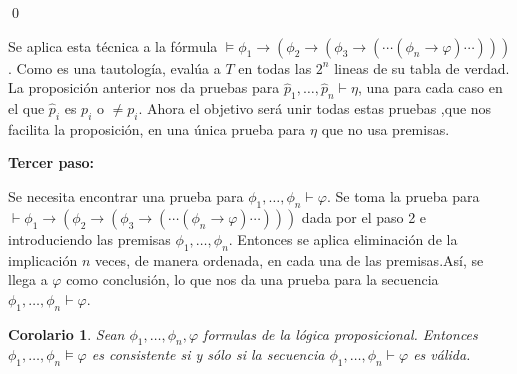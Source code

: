 \documentclass[18pt]{article}
\newtheorem{Cor}{Corolario}
\begin{document}
\qed

Se aplica esta técnica a la fórmula $\models \phi_1 \rightarrow ( \phi_2 \rightarrow ( \phi_3 \rightarrow ( \cdots (\phi_n \rightarrow \varphi )\cdots )))$. Como es una tautología, evalúa a $T$ en todas las $2^n$ lineas de su tabla de verdad. La proposición anterior nos da pruebas para $\hat{p}_1,\dots, \hat{p}_n \vdash \eta$, una para cada caso en el que $\hat{p}_i $ es $p_i$ o $\neq p_i$. Ahora el objetivo será unir todas estas pruebas ,que nos facilita la proposición, en una única prueba para $\eta$ que no usa premisas. 


\vspace{2mm}
\textbf{Tercer paso:}

Se necesita encontrar una prueba para $\phi_1,\dots, \phi_n \vdash \varphi$. Se toma la prueba para $\vdash \phi_1 \rightarrow ( \phi_2 \rightarrow (\phi_3 \rightarrow ( \cdots (\phi_n \rightarrow \varphi ) \cdots )))$ dada por el paso 2 e introduciendo las premisas $\phi_1,\dots, \phi_n$. Entonces se aplica eliminación de la implicación $n$ veces, de manera ordenada, en cada una de  las premisas.Así, se llega a  $\varphi$ como conclusión, lo que nos da una prueba para la secuencia $\phi_1,\dots, \phi_n \vdash \varphi$. 

\begin{Cor}
Sean $\phi_1,\dots , \phi_n,\varphi$ formulas de la lógica
proposicional. Entonces $\phi_1,\dots, \phi_n \models \varphi$ es consistente
si y sólo si la secuencia $\phi_1,\dots, \phi_n \vdash \varphi$ es válida. 
\end{Cor}
\end{document}
